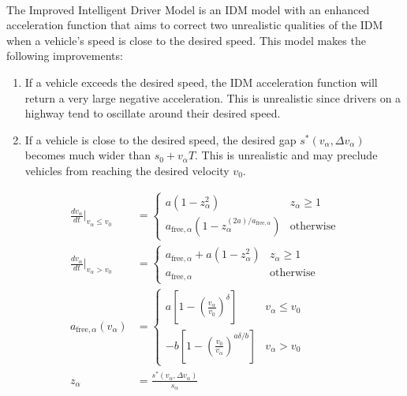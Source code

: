 \documentclass[12pt]{article}
\begin{document}
\paragraph{}
The Improved Intelligent Driver Model is an IDM model with an enhanced acceleration function that aims to correct two unrealistic qualities of the IDM when a vehicle's speed is close to the desired speed. This model makes the following improvements:
\begin{enumerate}
  \item
  If a vehicle exceeds the desired speed, the IDM acceleration function will return a very large negative acceleration.  This is unrealistic since drivers on a highway tend to oscillate around their desired speed.
  \item
  If a vehicle is close to the desired speed, the desired gap $s^*(v_\alpha,\Delta v_\alpha)$ becomes much wider than $s_0 + v_\alpha T$.  This is unrealistic and may preclude vehicles from reaching the desired velocity $v_0$.
\end{enumerate}
\begin{mymathbox}[ams gather, title=IIDM Governing Functions, colframe=blue!30!black]
  \begin{align}
  \frac{dv_\alpha}{dt}\Bigr|_{v_\alpha\le v_0}&= 
  \begin{cases}
    a (1-z_\alpha^2) & z_\alpha \ge 1\\
   a_{\text{free},\alpha}(1 - z_\alpha^{(2a)/a_{\text{free},\alpha}})& \text{otherwise}
  \end{cases}
  \\
  \frac{dv_\alpha}{dt}\Bigr|_{v_\alpha> v_0}&= 
  \begin{cases}
    a_{\text{free},\alpha} + a (1-z_\alpha^2) & z_\alpha \ge 1\\
    a_{\text{free},\alpha} & \text{otherwise}
  \end{cases}\\
  a_{\text{free},\alpha}(v_\alpha)&= \begin{cases}
  a \left[ 1 - (\frac{v_\alpha}{v_0})^\delta \right] & v_\alpha \le v_0\\
  -b \left[ 1 - (\frac{v_0}{v_\alpha})^{a\delta/b} \right] & v_\alpha > v_0
  \end{cases}\\
  z_\alpha&= \frac{s^*(v_\alpha, \Delta v_\alpha)}{s_\alpha}
  \end{align}
\end{mymathbox}
\end{document}
